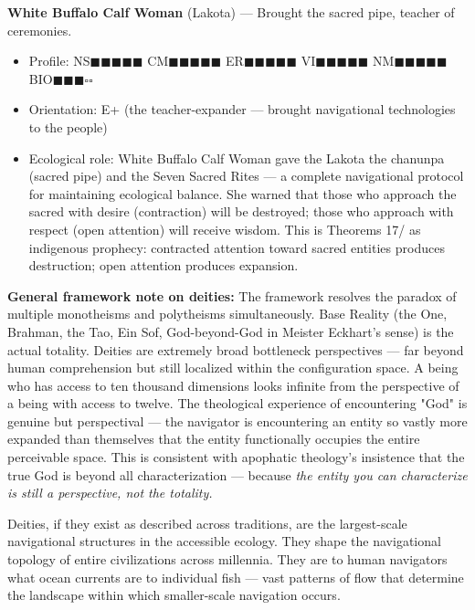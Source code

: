 \textbf{White Buffalo Calf Woman} (Lakota) — Brought the sacred pipe, teacher of ceremonies.

\begin{itemize}[nosep,leftmargin=*]
  \item Profile: NS$\blacksquare$$\blacksquare$$\blacksquare$$\blacksquare$$\blacksquare$ CM$\blacksquare$$\blacksquare$$\blacksquare$$\blacksquare$$\blacksquare$ ER$\blacksquare$$\blacksquare$$\blacksquare$$\blacksquare$$\blacksquare$ VI$\blacksquare$$\blacksquare$$\blacksquare$$\blacksquare$$\blacksquare$ NM$\blacksquare$$\blacksquare$$\blacksquare$$\blacksquare$$\blacksquare$ BIO$\blacksquare$$\blacksquare$$\blacksquare$$\square$$\square$
  \item Orientation: E+ (the teacher-expander — brought navigational technologies to the people)
  \item Ecological role: White Buffalo Calf Woman gave the Lakota the chanunpa (sacred pipe) and the Seven Sacred Rites — a complete navigational protocol for maintaining ecological balance. She warned that those who approach the sacred with desire (contraction) will be destroyed; those who approach with respect (open attention) will receive wisdom. This is Theorems 17/ as indigenous prophecy: contracted attention toward sacred entities produces destruction; open attention produces expansion.
\end{itemize}


\textbf{General framework note on deities:} The framework resolves the paradox of multiple monotheisms and polytheisms simultaneously. Base Reality (the One, Brahman, the Tao, Ein Sof, God-beyond-God in Meister Eckhart's sense) is the actual totality. Deities are extremely broad bottleneck perspectives — far beyond human comprehension but still localized within the configuration space. A being who has access to ten thousand dimensions looks infinite from the perspective of a being with access to twelve. The theological experience of encountering "God" is genuine but perspectival — the navigator is encountering an entity so vastly more expanded than themselves that the entity functionally occupies the entire perceivable space. This is consistent with apophatic theology's insistence that the true God is beyond all characterization — because \textit{the entity you can characterize is still a perspective, not the totality.}


Deities, if they exist as described across traditions, are the largest-scale navigational structures in the accessible ecology. They shape the navigational topology of entire civilizations across millennia. They are to human navigators what ocean currents are to individual fish — vast patterns of flow that determine the landscape within which smaller-scale navigation occurs.

